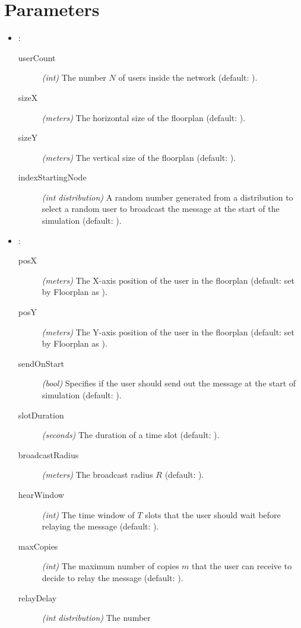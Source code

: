 \section{Parameters}\label{sec:parameters}

\begin{itemize}
	\item {}:
		\begin{description}
			\item[userCount] \textit{(int)} The number \(N\) of
				users inside the network (default: ).
			\item[sizeX] \textit{(meters)} The horizontal size of
				the floorplan (default: ).
			\item[sizeY] \textit{(meters)} The vertical size of the
				floorplan (default: ).
			\item[indexStartingNode] \textit{(int distribution)} A
				random number generated from a distribution to
				select a random user to broadcast the message at
				the start of the simulation (default:
				).
		\end{description}
	\item {}:
		\begin{description}
			\item[posX] \textit{(meters)} The X-axis position of the
				user in the floorplan (default: set by Floorplan
				as ).
			\item[posY] \textit{(meters)} The Y-axis position of the
				user in the floorplan (default: set by Floorplan
				as ).
			\item[sendOnStart] \textit{(bool)} Specifies if the user
				should send out the message at the start of
				simulation (default: ).
			\item[slotDuration] \textit{(seconds)} The duration of a
				time slot (default: ).
			\item[broadcastRadius] \textit{(meters)} The broadcast
				radius \(R\) (default: ).
			\item[hearWindow] \textit{(int)} The time window of
				\(T\) slots that the user should wait before
				relaying the message (default: ).
			\item[maxCopies] \textit{(int)} The maximum number of
				copies \(m\) that the user can receive to decide
				to relay the message (default: ).
			\item[relayDelay] \textit{(int distribution)} The number

\end{description}
\end{itemize}

